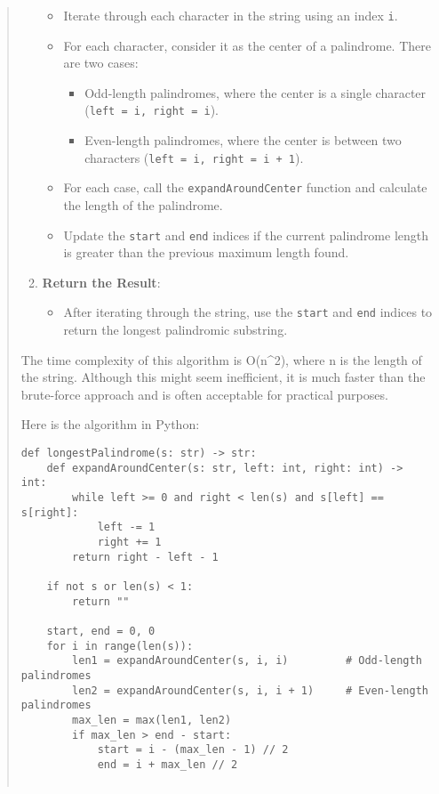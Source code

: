 \documentclass[fleqn,10pt]{wlscirep}
\providecommand{\tightlist}{%
  \setlength{\itemsep}{0pt}\setlength{\parskip}{0pt}}
\begin{document}
\begin{quote}
\begin{enumerate}
  \begin{itemize}
  \tightlist
  \item
    Iterate through each character in the string using an index
    \texttt{i}.
  \item
    For each character, consider it as the center of a palindrome. There
    are two cases:

    \begin{itemize}
    \tightlist
    \item
      Odd-length palindromes, where the center is a single character
      (\texttt{left\ =\ i,\ right\ =\ i}).
    \item
      Even-length palindromes, where the center is between two
      characters (\texttt{left\ =\ i,\ right\ =\ i\ +\ 1}).
    \end{itemize}
  \item
    For each case, call the \texttt{expandAroundCenter} function and
    calculate the length of the palindrome.
  \item
    Update the \texttt{start} and \texttt{end} indices if the current
    palindrome length is greater than the previous maximum length found.
  \end{itemize}
\item
  \textbf{Return the Result}:

  \begin{itemize}
  \tightlist
  \item
    After iterating through the string, use the \texttt{start} and
    \texttt{end} indices to return the longest palindromic substring.
  \end{itemize}
\end{enumerate}

The time complexity of this algorithm is O(n\^{}2), where n is the
length of the string. Although this might seem inefficient, it is much
faster than the brute-force approach and is often acceptable for
practical purposes.

Here is the algorithm in Python:

\begin{verbatim}
def longestPalindrome(s: str) -> str:
    def expandAroundCenter(s: str, left: int, right: int) -> int:
        while left >= 0 and right < len(s) and s[left] == s[right]:
            left -= 1
            right += 1
        return right - left - 1

    if not s or len(s) < 1:
        return ""

    start, end = 0, 0
    for i in range(len(s)):
        len1 = expandAroundCenter(s, i, i)         # Odd-length palindromes
        len2 = expandAroundCenter(s, i, i + 1)     # Even-length palindromes
        max_len = max(len1, len2)
        if max_len > end - start:
            start = i - (max_len - 1) // 2
            end = i + max_len // 2


\end{verbatim}
\end{quote}
\end{document}
